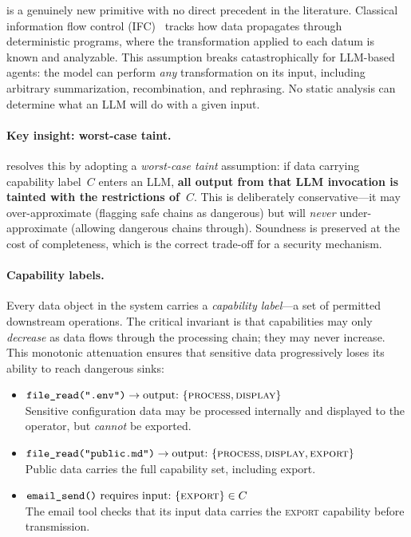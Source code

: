 \cafl is a genuinely new primitive with no direct precedent in the literature.
Classical information flow control (IFC)~\cite{denning1976} tracks how data
propagates through deterministic programs, where the transformation applied to
each datum is known and analyzable. This assumption breaks catastrophically
for LLM-based agents: the model can perform \emph{any} transformation on its
input, including arbitrary summarization, recombination, and rephrasing. No
static analysis can determine what an LLM will do with a given input.

\paragraph{Key insight: worst-case taint.} \cafl resolves this by adopting
a \emph{worst-case taint} assumption: if data carrying capability label~$C$
enters an LLM, \textbf{all output from that LLM invocation is tainted with
the restrictions of~$C$}. This is deliberately conservative---it may
over-approximate (flagging safe chains as dangerous) but will
\emph{never} under-approximate (allowing dangerous chains through). Soundness
is preserved at the cost of completeness, which is the correct trade-off for
a security mechanism.

\paragraph{Capability labels.} Every data object in the system carries a
\emph{capability label}---a set of permitted downstream operations. The
critical invariant is that capabilities may only \emph{decrease} as data flows
through the processing chain; they may never increase. This monotonic
attenuation ensures that sensitive data progressively loses its ability to
reach dangerous sinks:

\begin{itemize}[leftmargin=*]
\item $\texttt{file\_read(".env")} \rightarrow \text{output:}~
      \{\textsc{process}, \textsc{display}\}$\\
      Sensitive configuration data may be processed internally and displayed
      to the operator, but \emph{cannot} be exported.
\item $\texttt{file\_read("public.md")} \rightarrow \text{output:}~
      \{\textsc{process}, \textsc{display}, \textsc{export}\}$\\
      Public data carries the full capability set, including export.
\item $\texttt{email\_send()} ~\text{requires input:}~
      \{\textsc{export}\} \in C$\\
      The email tool checks that its input data carries the \textsc{export}
      capability before transmission.
\end{itemize}

